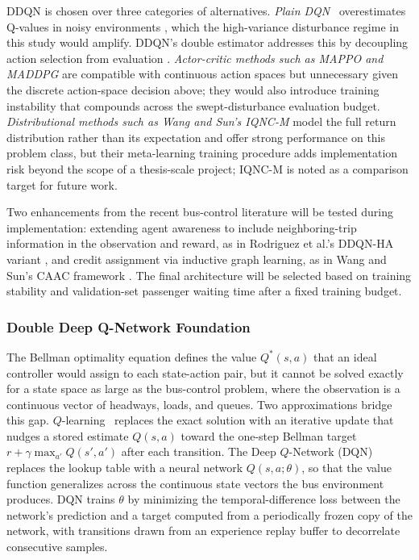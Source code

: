DDQN is chosen over three categories of alternatives. \textit{Plain DQN}~\cite{Mnih2015DQN} overestimates Q-values in noisy environments \cite{vanHasselt2016DDQN,Henderson2018Matters}, which the high-variance disturbance regime in this study would amplify. DDQN's double estimator addresses this by decoupling action selection from evaluation \cite{vanHasselt2016DDQN}. \textit{Actor-critic methods such as MAPPO and MADDPG} are compatible with continuous action spaces but unnecessary given the discrete action-space decision above; they would also introduce training instability that compounds across the swept-disturbance evaluation budget. \textit{Distributional methods such as Wang and Sun's IQNC-M} \cite{Wangsun} model the full return distribution rather than its expectation and offer strong performance on this problem class, but their meta-learning training procedure adds implementation risk beyond the scope of a thesis-scale project; IQNC-M is noted as a comparison target for future work.

Two enhancements from the recent bus-control literature will be tested during implementation: extending agent awareness to include neighboring-trip information in the observation and reward, as in Rodriguez et al.'s DDQN-HA variant \cite{Rodriguez2023Cooperative}, and credit assignment via inductive graph learning, as in Wang and Sun's CAAC framework \cite{Wangsun}. The final architecture will be selected based on training stability and validation-set passenger waiting time after a fixed training budget.


\subsubsection{Double Deep Q-Network Foundation}
\label{subsec:ddqn-foundation}

The Bellman optimality equation defines the value $Q^*(s,a)$ that an ideal controller would assign to each state-action pair, but it cannot be solved exactly for a state space as large as the bus-control problem, where the observation is a continuous vector of headways, loads, and queues. Two approximations bridge this gap. $Q$-learning~\cite{Bellman1957,Littman1994} replaces the exact solution with an iterative update that nudges a stored estimate $Q(s,a)$ toward the one-step Bellman target $r + \gamma \max_{a'} Q(s',a')$ after each transition. The Deep $Q$-Network (DQN)~\cite{Mnih2015DQN} replaces the lookup table with a neural network $Q(s,a;\theta)$, so that the value function generalizes across the continuous state vectors the bus environment produces. DQN trains $\theta$ by minimizing the temporal-difference loss between the network's prediction and a target computed from a periodically frozen copy of the network, with transitions drawn from an experience replay buffer to decorrelate consecutive samples.

